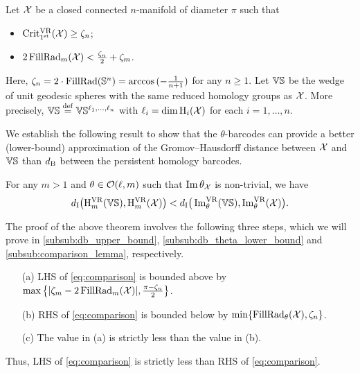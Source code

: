 \label{ss:genberal_distance_comparison}

Let $\mathcal{X}$ be a closed connected \(n\)-manifold of diameter $\pi$ such that 
\begin{itemize}
    \item $\operatorname{Crit^{\mathrm{VR}}_{1^{\mathrm{st}}}}(\mathcal{X}) \geq \zeta_n $;
    \item $2\operatorname{FillRad}_{m}(\mathcal{X}) < \tfrac{\zeta_n}{2}+\zeta_m$.
\end{itemize}
Here, $\zeta_n = 2 \cdot \operatorname{FillRad}(\mathbb{S}^n)= \arccos{(-\tfrac{1}{n+1})}$ for any $n\geq 1$.
Let $\mathbb{V}\mathbb{S}$ be the wedge of unit geodesic spheres with the same reduced homology groups as $\mathcal{X}$.
More precisely, $\mathbb{V}\mathbb{S} \stackrel{\mathrm{def}}{=} \mathbb{V}\mathbb{S}^{\ell_1, \dots, \ell_n}$ with $\ell_i = \dim \operatorname{H}_i(\mathcal{X})$ for each $i = 1,\dots, n$.

We establish the following result to show that the $\theta$-barcodes can provide a better (lower-bound) approximation of the Gromov--Hausdorff distance between $\mathcal{X}$ and $\mathbb{V}\mathbb{S}$ than $d_{\mathrm{B}}$ between the persistent homology barcodes.


\medskip\theorem
For any $m>1$ and $\theta \in \mathcal{O}(\ell, m)$ such that $\operatorname{Im} \theta_{\mathcal{X}}$ is non-trivial, we have
\begin{equation}\label{eq:comparison}
    d_{\mathrm{I}}\big(\mathrm{H}^{\mathrm{VR}}_{m}(\mathbb{V}\mathbb{S}), \mathrm{H}^{\mathrm{VR}}_{m}(\mathcal{X})\big) < d_{\mathrm{I}}\big(\operatorname{Im}^{\mathrm{VR}}_{\theta}(\mathbb{V}\mathbb{S}), \operatorname{Im}^{\mathrm{VR}}_{\theta}(\mathcal{X})\big) .
\end{equation}


The proof of the above theorem involves the following three steps, which we will prove in \cref{subsub:db_upper_bound}, \cref{subsub:db_theta_lower_bound} and \cref{subsub:comparison_lemma}, respectively. 
\begin{enumerate}
    \item [(a)] LHS of \cref{eq:comparison} is bounded above by $\max\big\{|\zeta_m  - 2\operatorname{FillRad}_{m}(\mathcal{X}) |, \tfrac{\pi - \zeta_n}{2}\big\}$.
    \item [(b)] RHS of \cref{eq:comparison} is bounded below by $\min\{\operatorname{FillRad}_{\theta}(\mathcal{X}), \zeta_n\}$.
    \item [(c)] The value in (a) is strictly less than the value in (b).
\end{enumerate}
Thus, LHS of \cref{eq:comparison} is strictly less than RHS of \cref{eq:comparison}.


